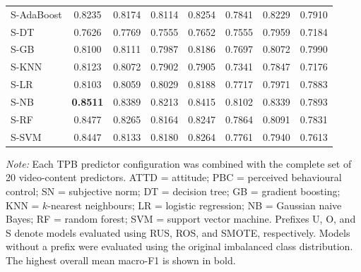 \documentclass[jtaer,article,submit,moreauthors]{Definitions/mdpi}
\begin{document}
\begin{table}[!t]
{\begin{tabular}{lccccccc}
			S-AdaBoost & 0.8235 & 0.8174 & 0.8114 & 0.8254 & 0.7841 & 0.8229 & 0.7910 \\
			S-DT       & 0.7626 & 0.7769 & 0.7555 & 0.7652 & 0.7555 & 0.7959 & 0.7184 \\
			S-GB       & 0.8100 & 0.8111 & 0.7987 & 0.8186 & 0.7697 & 0.8072 & 0.7990 \\
			S-KNN      & 0.8123 & 0.8072 & 0.7902 & 0.7905 & 0.7341 & 0.7847 & 0.7176 \\
			S-LR       & 0.8103 & 0.8059 & 0.8029 & 0.8188 & 0.7717 & 0.7971 & 0.7883 \\
			S-NB       & \textbf{0.8511} & 0.8389 & 0.8213 & 0.8415 & 0.8102 & 0.8339 & 0.7893 \\
			S-RF       & 0.8477 & 0.8265 & 0.8164 & 0.8247 & 0.7864 & 0.8091 & 0.7831 \\
			S-SVM      & 0.8447 & 0.8133 & 0.8180 & 0.8264 & 0.7761 & 0.7940 & 0.7613 \\
			
			\bottomrule
		\end{tabular}%
	}
	
	\vspace{1mm}
	
	\begin{minipage}{\textwidth}
		\footnotesize
		\textit{Note:} Each TPB predictor configuration was combined with the
		complete set of 20 video-content predictors. ATTD = attitude;
		PBC = perceived behavioural control; SN = subjective norm;
		DT = decision tree; GB = gradient boosting;
		KNN = \(k\)-nearest neighbours; LR = logistic regression;
		NB = Gaussian naive Bayes; RF = random forest;
		SVM = support vector machine. Prefixes U, O, and S denote models
		evaluated using RUS, ROS, and SMOTE, respectively. Models without a
		prefix were evaluated using the original imbalanced class distribution.
		The highest overall mean macro-F1 is shown in bold.
	\end{minipage}
	
\end{table}

\renewcommand{\arraystretch}{1}
\end{document}
